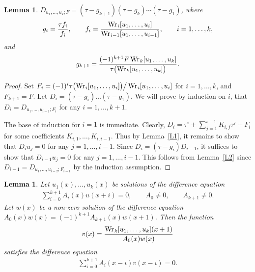 \documentclass[pdftex]{sigma}
\numberwithin{equation}{section}
\newtheorem{lem}[thm]{Lemma}
 { \theoremstyle{definition}
\newtheorem{Remark}[thm]{Remark} }
\def\lc{,\allowbreak\ldots,\allowbreak}
\def\Wr{\mathop{\mathrm{Wr\vrule height0pt width.6pt}}\nolimits}
\begin{document}
\begin{lem} \label{L3}$ D_{u_1\lc u_k; F}=(\tau-g_{k+1}) (\tau-g_k) \cdots (\tau-g_1)$, where
\begin{gather*}
g_i = \frac{\tau f_i}{f_i},\qquad f_i = \frac{\Wr_i[u_1\lc u_i]}{\Wr_{i-1}[u_1\lc u_{i-1}]},
\qquad i=1\lc k,
\end{gather*}
and
\begin{gather*}
g_{k+1} = \frac{(-1)^{k+1}F\Wr_k[u_1\lc u_k]}
{\tau\bigl(\Wr_k[u_1\lc u_k]\bigr)}.
\end{gather*}
\end{lem}
\begin{proof}Set $F_i=(-1)^i \tau\bigl(\Wr_i[u_1\lc u_i]\bigr)\big/ \Wr_i[u_1\lc u_i]$ for $i=1\lc k$, and $F_{k+1}=F$. Let $D_i=(\tau-g_i) \dots (\tau-g_1)$. We will prove by induction on $i$, that $D_i=D_{u_1\lc u_{i-1}; F_i}$ for any $i=1\lc k+1$.

The base of induction for $i=1$ is immediate. Clearly, $D_i=\tau^i+\sum\limits_{j=1}^{i-1} K_{i,j} \tau^j+F_i$ for some coefficients $K_{i,1}\lc K_{i,i-1}$. Thus by Lemma~\ref{L1}, it remains to show that $D_iu_j=0$ for any $j=1\lc i-1$. Since $D_i=(\tau-g_i) D_{i-1}$, it suffices to show that $D_{i-1}u_j=0$ for any $j=1\lc i-1$. This follows from Lemma~\ref{L2} since $D_{i-1}=D_{u_1\lc u_{i-2}; F_{i-1}}$ by the induction assumption.
\end{proof}

\begin{lem}\label{L4} Let $u_1(x)\lc u_k(x)$ be solutions of the difference equation
\begin{gather}
\sum_{i=0}^{k+1} A_i(x) u(x+i) = 0,\qquad A_0\ne 0,\qquad A_{k+1}\ne 0.\label{e2}
\end{gather}
Let $w(x)$ be a non-zero solution of the difference equation $A_0(x) w(x)=(-1)^{k+1}A_{k+1}(x) w(x+1)$. Then the function
\begin{gather*}
v(x) = \frac{\Wr_k[u_1\lc u_k](x+1)}{A_0(x) w(x)}%
\end{gather*}
satisfies the difference equation
\begin{gather}
\sum_{i=0}^{k+1} A_i(x-i) v(x-i) = 0.\label{e4}
\end{gather}
\end{lem}
\end{document}
